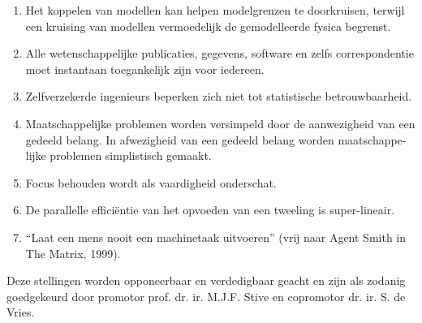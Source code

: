 \documentclass[headinclude,footinclude,cleardoublepage=empty,
numbers=noenddot,fontsize=9pt]{scrbook}
\begin{document}
\begin{titlepage}
\begin{otherlanguage}{dutch}
\begin{enumerate}
    \item Het koppelen van modellen kan helpen modelgrenzen te
      doorkruisen, terwijl een kruising van modellen vermoedelijk de
      gemodelleerde fysica begrenst.
      
    \item Alle wetenschappelijke publicaties, gegevens, software en
      zelfs correspondentie moet instantaan toegankelijk zijn voor
      iedereen.
      
    \item Zelfverzekerde ingenieurs beperken zich niet tot
      statistische betrouwbaarheid.
      
    \item Maatschappelijke problemen worden versimpeld door de
      aanwezigheid van een gedeeld belang. In afwezigheid van een
      gedeeld belang worden maatschappelijke problemen simplistisch
      gemaakt.

    \item Focus behouden wordt als vaardigheid onderschat.
      
    \item De parallelle effici\"{e}ntie van het opvoeden van een
      tweeling is super-lineair.
      
    \item ``Laat een mens nooit een machinetaak uitvoeren'' (vrij naar
      Agent Smith in The Matrix, 1999).
      
    \end{enumerate}
    
    \vfill
    
    \noindent Deze stellingen worden opponeerbaar en verdedigbaar
    geacht en zijn als zodanig goedgekeurd door promotor
    prof. dr. ir. M.J.F. Stive en copromotor dr. ir. S. de Vries.

  \end{otherlanguage}
  
\end{titlepage}
\end{document}
